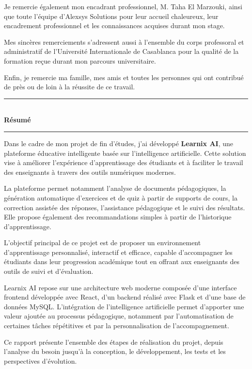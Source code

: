 \documentclass[12pt,a4paper]{report}
\newcommand{\fronttitle}[1]{
\begin{center}
{\color{learnixblue}\rule{0.35\textwidth}{1pt}}\\[0.4cm]
{\fontsize{20}{24}\selectfont\bfseries\color{learnixdark} #1}\\[0.2cm]
{\color{learnixblue}\rule{0.18\textwidth}{1pt}}
\end{center}
}
\begin{document}
Je remercie également mon encadrant professionnel, M. Taha El Marzouki,
ainsi que toute l'équipe d'Alexsys Solutions pour leur accueil chaleureux,
leur encadrement professionnel et les connaissances acquises durant mon stage.

Mes sincères remerciements s'adressent aussi à l'ensemble du corps professoral
et administratif de l'Université Internationale de Casablanca pour la qualité
de la formation reçue durant mon parcours universitaire.

Enfin, je remercie ma famille, mes amis et toutes les personnes qui ont
contribué de près ou de loin à la réussite de ce travail.


\clearpage
\thispagestyle{plain}

\fronttitle{Résumé}

\vspace{1.5cm}

Dans le cadre de mon projet de fin d'études, j'ai développé
\textbf{Learnix AI}, une plateforme éducative intelligente basée sur
l'intelligence artificielle. Cette solution vise à améliorer l'expérience
d'apprentissage des étudiants et à faciliter le travail des enseignants à
travers des outils numériques modernes.

La plateforme permet notamment l'analyse de documents pédagogiques,
la génération automatique d'exercices et de quiz à partir de supports de cours,
la correction assistée des réponses, l'assistance pédagogique et le suivi des
résultats. Elle propose également des recommandations simples à partir de
l'historique d'apprentissage.

L'objectif principal de ce projet est de proposer un environnement
d'apprentissage personnalisé, interactif et efficace, capable d'accompagner
les étudiants dans leur progression académique tout en offrant aux enseignants
des outils de suivi et d'évaluation.

Learnix AI repose sur une architecture web moderne composée d'une interface
frontend développée avec React, d'un backend réalisé avec Flask et d'une base
de données MySQL. L'intégration de l'intelligence artificielle permet d'apporter
une valeur ajoutée au processus pédagogique, notamment par l'automatisation de
certaines tâches répétitives et par la personnalisation de l'accompagnement.

Ce rapport présente l'ensemble des étapes de réalisation du projet, depuis
l'analyse du besoin jusqu'à la conception, le développement, les tests et les
perspectives d'évolution.
\end{document}
